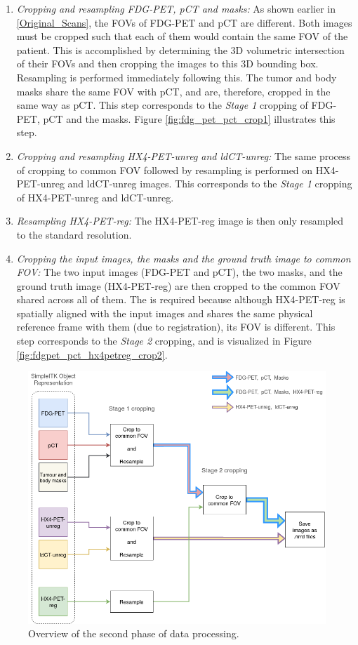 \begin{enumerate}
    \item \textit{Cropping and resampling FDG-PET, pCT and masks:} As shown earlier in \ref{Original_Scans}, the FOVs of FDG-PET and pCT are different. Both images must be cropped such that each of them would contain the same FOV of the patient. This is accomplished by determining the 3D volumetric intersection of their FOVs and then cropping the images to this 3D bounding box. Resampling is performed immediately following this. The tumor and body masks share the same FOV with pCT, and are, therefore, cropped in the same way as pCT. This step corresponds to the \textit{Stage 1} cropping of FDG-PET, pCT and the masks. Figure \ref{fig:fdg_pet_pct_crop1} illustrates this step.

    \item \textit{Cropping and resampling HX4-PET-unreg and ldCT-unreg:} The same process of cropping to common FOV followed by resampling is performed on HX4-PET-unreg and ldCT-unreg images. This corresponds to the \textit{Stage 1} cropping of HX4-PET-unreg and ldCT-unreg.

    \item \textit{Resampling HX4-PET-reg:} The HX4-PET-reg image is then only resampled to the standard resolution.

    \item \textit{Cropping the input images, the masks and the ground truth image to common FOV:} The two input images (FDG-PET and pCT), the two masks, and the ground truth image (HX4-PET-reg) are then cropped to the common FOV shared across all of them. The is required because although HX4-PET-reg is spatially aligned with the input images and shares the same physical reference frame with them (due to registration), its FOV is different. This step corresponds to the \textit{Stage 2} cropping, and is visualized in Figure \ref{fig:fdgpet_pct_hx4petreg_crop2}.
\end{enumerate}

\begin{figure}[h!]
    \centering
    \includegraphics[width=0.8\linewidth]{figures/Data/data_processing_overview-step_2.png}
    \caption{Overview of the second phase of data processing.}
    \label{fig:data_proc_overview_2}
\end{figure}

